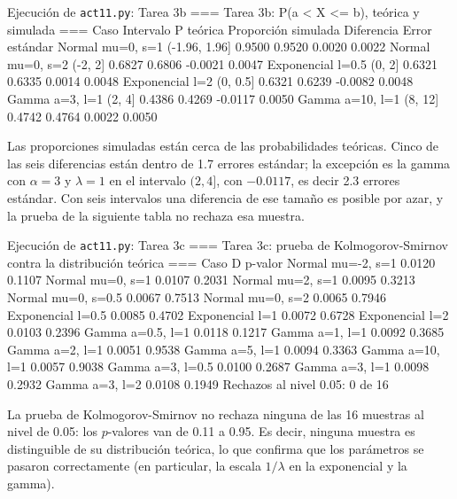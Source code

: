 \documentclass[11pt,letterpaper]{article}
\begin{document}
\begin{consola}[label=out:t3b]{Ejecución de \texttt{act11.py}: Tarea 3b}
=== Tarea 3b: P(a < X <= b), teórica y simulada ===
             Caso     Intervalo  P teórica  Proporción simulada  Diferencia  Error estándar
 Normal mu=0, s=1 (-1.96, 1.96]     0.9500               0.9520      0.0020          0.0022
 Normal mu=0, s=2       (-2, 2]     0.6827               0.6806     -0.0021          0.0047
Exponencial l=0.5        (0, 2]     0.6321               0.6335      0.0014          0.0048
  Exponencial l=2      (0, 0.5]     0.6321               0.6239     -0.0082          0.0048
   Gamma a=3, l=1        (2, 4]     0.4386               0.4269     -0.0117          0.0050
  Gamma a=10, l=1       (8, 12]     0.4742               0.4764      0.0022          0.0050
\end{consola}

Las proporciones simuladas están cerca de las probabilidades teóricas. Cinco de las seis diferencias están dentro de 1.7 errores estándar; la excepción es la gamma con $\alpha = 3$ y $\lambda = 1$ en el intervalo $(2, 4]$, con $-0.0117$, es decir 2.3 errores estándar. Con seis intervalos una diferencia de ese tamaño es posible por azar, y la prueba de la siguiente tabla no rechaza esa muestra.

\begin{consola}[label=out:t3c]{Ejecución de \texttt{act11.py}: Tarea 3c}
=== Tarea 3c: prueba de Kolmogorov-Smirnov contra la distribución teórica ===
              Caso      D  p-valor
 Normal mu=-2, s=1 0.0120   0.1107
  Normal mu=0, s=1 0.0107   0.2031
  Normal mu=2, s=1 0.0095   0.3213
Normal mu=0, s=0.5 0.0067   0.7513
  Normal mu=0, s=2 0.0065   0.7946
 Exponencial l=0.5 0.0085   0.4702
   Exponencial l=1 0.0072   0.6728
   Exponencial l=2 0.0103   0.2396
  Gamma a=0.5, l=1 0.0118   0.1217
    Gamma a=1, l=1 0.0092   0.3685
    Gamma a=2, l=1 0.0051   0.9538
    Gamma a=5, l=1 0.0094   0.3363
   Gamma a=10, l=1 0.0057   0.9038
  Gamma a=3, l=0.5 0.0100   0.2687
    Gamma a=3, l=1 0.0098   0.2932
    Gamma a=3, l=2 0.0108   0.1949
Rechazos al nivel 0.05: 0 de 16
\end{consola}

La prueba de Kolmogorov-Smirnov no rechaza ninguna de las 16 muestras al nivel de 0.05: los $p$-valores van de 0.11 a 0.95. Es decir, ninguna muestra es distinguible de su distribución teórica, lo que confirma que los parámetros se pasaron correctamente (en particular, la escala $1/\lambda$ en la exponencial y la gamma).
\end{document}
